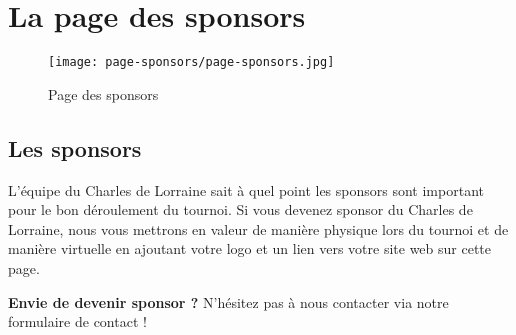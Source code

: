 \section{La page des sponsors}

\begin{figure}[H]
\centering
\texttt{[image: page-sponsors/page-sponsors.jpg]}
\caption{Page des sponsors}
\end{figure}

\subsection{Les sponsors}

L'équipe du Charles de Lorraine sait à quel point les sponsors sont important
pour le bon déroulement du tournoi. Si vous devenez sponsor du Charles de
Lorraine, nous vous mettrons en valeur de manière physique lors du tournoi et
de manière virtuelle en ajoutant votre logo et un lien vers votre site web sur
cette page. \newline

\textbf{Envie de devenir sponsor ?} N'hésitez pas à nous contacter via notre
formulaire de contact ! \newline

